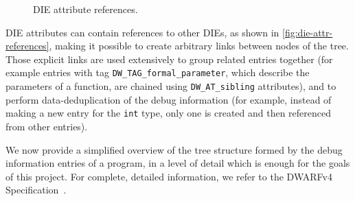 \begin{figure}
  \centering

  \caption{DIE attribute references.}
  \label{fig:die-attr-references}
\end{figure}

DIE attributes can contain references to other DIEs, as shown in
\autoref{fig:die-attr-references}, making it possible to create arbitrary
links between nodes of the tree. Those explicit links are used extensively to
group related entries together (for example entries with tag
\verb|DW_TAG_formal_parameter|, which describe the parameters of a function,
are chained using \verb|DW_AT_sibling| attributes), and to perform
\gls{data-deduplication} of the debug information (for example, instead of
making a new entry for the \texttt{int} type, only one is created and
then referenced from other entries).


\label{sec:debuginfo-structure}

We now provide a simplified overview of the tree structure formed by the debug
information entries of a program, in a level of detail which is enough for the
goals of this project. For complete, detailed information, we refer to the
DWARFv4 Specification~\cite{dwarfspecv4}.


